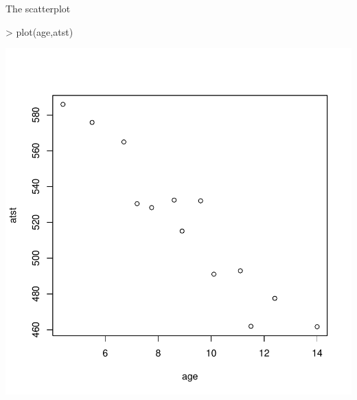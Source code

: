 \documentclass{beamer}
\begin{document}
\begin{frame}[fragile]{The scatterplot}


\begin{Schunk}
\begin{Sinput}
> plot(age,atst)
\end{Sinput}
\end{Schunk}
\includegraphics{Regression-002}


\end{frame}
\end{document}

